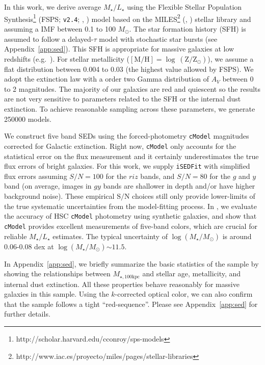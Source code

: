 \documentclass[a4paper,fleqn,usenatbib]{mnras}
\def\msun{$M_\odot$}
\def\cmodel{\texttt{cModel}}
\def\logms{{$\log (M_{\star}/M_{\odot})$}}
\def\mtot{{$M_{\star,100\mathrm{kpc}}$}}
\def\m2l{{$M_{\star}/L_{\star}$}}
\def\s2n{{$\mathrm{S}/\mathrm{N}$}}
\begin{document}
    In this work, we derive average \m2l{} using the Flexible Stellar Population 
    Synthesis\footnote{http://scholar.harvard.edu/cconroy/sps-models}
    (FSPS; \texttt{v2.4}; \citealt{FSPS}, \citealt{Conroy2010}) model based on the 
    MILES\footnote{http://www.iac.es/proyecto/miles/pages/stellar-libraries}
    (\citealt{MILES1}, \citealt{MILES2}) stellar library and assuming a
    \citet{Chabrier2003} IMF between 0.1 to 100 \msun. 
    The star formation history (SFH) is assumed to follow a delayed-$\tau$ model with 
    stochastic star bursts (see Appendix~\ref{app:sed}). 
    This SFH is appropriate for massive galaxies at low redshifts 
    (e.g.\ \citealt{Kauffmann2003}). 
    For stellar metallicity 
    ($[\mathrm{M}/\mathrm{H}]=\log\ (\mathrm{Z}/\mathrm{Z}_{\odot})$), we assume a 
    flat distribution between 0.004 to 0.03 (the highest value allowed by FSPS).
    We adopt the \citet{Calzetti2000} extinction law with a order two Gamma 
    distribution of $A_{V}$ between 0 to 2 magnitudes. 
    The majority of our galaxies are red and quiescent so the results are not 
    very sensitive to parameters related to the SFH or the internal dust extinction. 
    To achieve reasonable sampling across these parameters, we generate 250000 
    models. 
    
    We construct five band SEDs using the forced-photometry \cmodel{} magnitudes 
    corrected for Galactic extinction. 
    Right now, \cmodel{} only accounts for the statistical error on the flux 
    measurement and it certainly underestimates the true flux errors of bright 
    galaxies.  
    For this work, we supply \texttt{iSEDFit} with simplified flux errors assuming 
    $S/N = 100$ for the $riz$ bands, and $S/N = 80$ for the $g$ and $y$ band 
    (on average, images in $gy$ bands are shallower in depth and/or have higher 
    background noise).  
    These empirical \s2n{} choices still only provide lower-limits of the true 
    systematic uncertainties from the model-fitting process. 
    In \citealt{SynPipe}, we evaluate the accuracy of HSC \cmodel{} photometry 
    using synthetic galaxies, and show that \cmodel{} provides excellent measurements 
    of five-band colors, which are crucial for reliable \m2l{} estimates.
    The typical uncertainty of \logms{} is around 0.06-0.08 dex at \logms${\sim} 11.5$.
    
    In Appendix~\ref{app:sed}, we briefly summarize the basic statistics of 
    the sample by showing the relationships between \mtot{} and stellar age, 
    metallicity, and internal dust extinction. 
    All these properties behave reasonably for massive galaxies in this sample. 
    Using the $k$-corrected optical color, we can also confirm that the sample follows 
    a tight ``red-sequence''.  
    Please see Appendix~\ref{app:sed} for further details.
      
\end{document}
